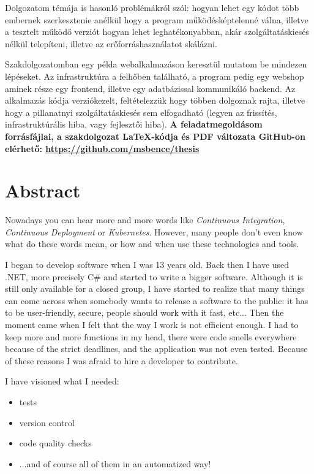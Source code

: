Dolgozatom témája is hasonló problémákról szól: hogyan lehet egy kódot több embernek szerkesztenie anélkül hogy a program működésképtelenné válna, illetve a tesztelt működő verziót hogyan lehet leghatékonyabban, akár szolgáltatáskiesés nélkül telepíteni, illetve az erőforráshasználatot skálázni.

Szakdolgozatomban egy példa webalkalmazáson keresztül mutatom be mindezen lépéseket. Az infrastruktúra a felhőben található, a program pedig egy webshop aminek része egy frontend, illetve egy adatbázissal kommunikáló backend. Az alkalmazás kódja verziókezelt, feltételezzük hogy többen dolgoznak rajta, illetve hogy a pillanatnyi szolgáltatáskiesés sem elfogadható (legyen az frissítés, infrastruktúrális hiba, vagy fejlesztői hiba). 
\newline
\newline
\textbf{A feladatmegoldásom forrásfájlai, a szakdolgozat \LaTeX-kódja és PDF változata GitHub-on elérhető: \url{https://github.com/msbence/thesis}}
\vfill
\selectenglish


\chapter*{Abstract}

Nowadays you can hear more and more words like \textit{Continuous Integration}, \textit{Continuous Deployment} or \textit{Kubernetes}. However, many people don't even know what do these words mean, or how and when use these technologies and tools.

I began to develop software when I was 13 years old. Back then I have used .NET, more precisely C\# and started to write a bigger software. Although it is still only available for a closed group, I have started to realize that many things can come across when somebody wants to release a software to the public: it has to be user-friendly, secure, people should work with it fast, etc... Then the moment came when I felt that the way I work is not efficient enough. I had to keep more and more functions in my head, there were code smells everywhere because of the strict deadlines, and the application was not even tested. Because of these reasons I was afraid to hire a developer to contribute.

I have visioned what I needed:
\begin{itemize}
    \item tests
    \item version control
    \item code quality checks
    \item ...and of course all of them in an automatized way!
\end{itemize}

